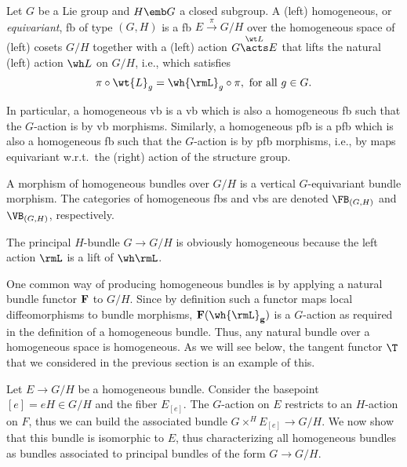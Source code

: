 \begin{defn}
    Let $G$ be a Lie group and $H\emb G$ a closed subgroup. A (left) homogeneous, or \emph{equivariant}, \gls{fb} of type $(G,H)$ is a \gls{fb} $E\overset{\pi}{\to}G\slash H$ over the homogeneous space of (left) cosets $G\slash H$ together with a (left) action $G\overset{\wt L}{\acts} E$ that lifts the natural (left) action $\wh L$ on $G\slash H$, i.e., which satisfies \[\pi\circ \wt{L}_g=\wh{\rmL}_g\circ \pi,\text{ for all } g\in G.\] 

    In particular, a homogeneous \gls{vb} is a \gls{vb} which is also a homogeneous \gls{fb} such that the $G$-action is by \gls{vb} morphisms. Similarly, a homogeneous \gls{pfb} is a \gls{pfb} which is also a homogeneous \gls{fb} such that the $G$-action is by \gls{pfb} morphisms, i.e., by maps equivariant w.r.t.\ the (right) action of the structure group.

    A morphism of homogeneous bundles over $G\slash H$ is a vertical $G$-equivariant bundle morphism. The categories of homogeneous \glspl{fb} and \glspl{vb} are denoted $\FB_{(G,H)}$ and $\VB_{(G,H)}$, respectively. 
\end{defn}

\begin{example}
    The principal $H$-bundle $G\to G\slash H$ is obviously homogeneous because the left action $\rmL$ is a lift of $\wh \rmL$.
\end{example}

One common way of producing homogeneous bundles is by applying a natural bundle functor $\bf{F}$ to $G\slash H$. Since by definition such a functor maps local diffeomorphisms to bundle morphisms, $\bf{F}(\wh{\rmL}_g)$ is a $G$-action as required in the definition of a homogeneous bundle. Thus, any natural bundle over a homogeneous space is homogeneous. As we will see below, the tangent functor $\T$ that we considered in the previous section is an example of this.

Let $E\to G\slash H$ be a homogeneous bundle. Consider the basepoint $[e]=eH\in G\slash H$ and the fiber $E_{[e]}$. The $G$-action on $E$ restricts to an $H$-action on $F$, thus we can build the associated bundle $G\times^H E_{[e]}\to G\slash H$. We now show that this bundle is isomorphic to $E$, thus characterizing all homogeneous bundles as bundles associated to principal bundles of the form $G\to G\slash H$.

